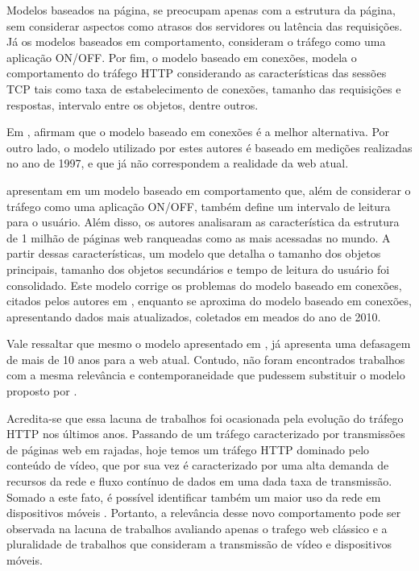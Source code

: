 Modelos baseados na página, se preocupam apenas com a estrutura da página, sem considerar aspectos como atrasos dos servidores ou latência das requisições. Já os modelos baseados em comportamento, consideram o tráfego como uma aplicação ON/OFF. Por fim, o modelo baseado em conexões, modela o comportamento do tráfego HTTP considerando as características das sessões TCP tais como taxa de estabelecimento de conexões, tamanho das requisições e respostas, intervalo entre os objetos, dentre outros.

Em \cite{Cheng2013},  afirmam que o modelo baseado em conexões é a melhor alternativa. Por outro lado, o modelo utilizado por estes autores é baseado em medições realizadas no ano de 1997, e que já não correspondem a realidade da web atual.

 apresentam em \cite{Pries2012} um modelo baseado em comportamento que, além de considerar o tráfego como uma aplicação ON/OFF, também define um intervalo de leitura para o usuário. Além disso, os autores analisaram as característica da estrutura de 1 milhão de páginas web ranqueadas como as mais acessadas no mundo. A partir dessas características, um modelo que detalha o tamanho dos objetos principais, tamanho dos objetos secundários e tempo de leitura do usuário foi consolidado. Este modelo corrige os problemas do modelo baseado em conexões, citados pelos autores em \cite{Cheng2013}, enquanto se aproxima do modelo baseado em conexões, apresentando dados mais atualizados, coletados em meados do ano de 2010. 

Vale ressaltar que mesmo o modelo apresentado em \cite{Pries2012}, já apresenta uma defasagem de mais de 10 anos para a web atual. Contudo, não foram encontrados trabalhos com a mesma relevância e contemporaneidade que pudessem substituir o modelo proposto por .

Acredita-se que essa lacuna de trabalhos foi ocasionada pela evolução do tráfego HTTP nos últimos anos. Passando de um tráfego caracterizado por transmissões de páginas web em rajadas, hoje temos um tráfego HTTP dominado pelo conteúdo de vídeo, que por sua vez é caracterizado por uma alta demanda de recursos da rede e fluxo contínuo de dados em uma dada taxa de transmissão. Somado a este fato, é possível identificar também um maior uso da rede em dispositivos móveis \cite{cisco-newsroom-vni-2017-2022} \cite{g1-2016}. Portanto, a relevância desse novo comportamento pode ser observada na lacuna de trabalhos avaliando apenas o trafego web clássico e a pluralidade de trabalhos que consideram a transmissão de vídeo e dispositivos móveis.

